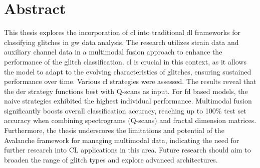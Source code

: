 \section*{Abstract}
This thesis explores the incorporation of \acrfull{cl} into traditional \acrfull{dl} frameworks for classifying glitches in \acrfull{gw} data analysis. The research utilizes strain data and auxiliary channel data in a multimodal fusion approach to enhance the performance of the glitch classification. \acrshort{cl} is crucial in this context, as it allows the model to adapt to the evolving characteristics of glitches, ensuring sustained performance over time. Various \acrlong{cl} strategies were assessed. The results reveal that the \acrshort{der} strategy functions best with Q-scans as input. For \acrshort{fd} based models, the naive strategies exhibited the highest individual performance. Multimodal fusion significantly boosts overall classification accuracy, reaching up to 100\% test set accuracy when combining spectrograms (Q-scans) and fractal dimension matrices. Furthermore, the thesis underscores the limitations and potential of the Avalanche framework for managing multimodal data, indicating the need for further research into CL applications in this area. Future research should aim to broaden the range of glitch types and explore advanced architectures.

